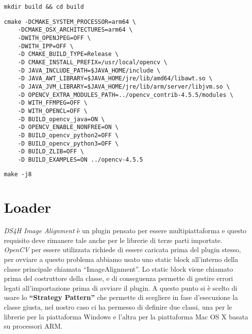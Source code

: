 \begin{lstlisting}[label={lst:mdkdirbuild}, caption={Creazione cartella Build}]
    mkdir build && cd build
\end{lstlisting}

\begin{minipage}{\linewidth}
\begin{lstlisting}[label={lst:extract}, caption={Esempio di creazione di build estrazione dalla sorgente per piattaforma MacOs X con processore M1}]
    cmake -DCMAKE_SYSTEM_PROCESSOR=arm64 \
    -DCMAKE_OSX_ARCHITECTURES=arm64 \
    -DWITH_OPENJPEG=OFF \
    -DWITH_IPP=OFF \
    -D CMAKE_BUILD_TYPE=Release \
    -D CMAKE_INSTALL_PREFIX=/usr/local/opencv \
    -D JAVA_INCLUDE_PATH=$JAVA_HOME/include \
    -D JAVA_AWT_LIBRARY=$JAVA_HOME/jre/lib/amd64/libawt.so \
    -D JAVA_JVM_LIBRARY=$JAVA_HOME/jre/lib/arm/server/libjvm.so \
    -D OPENCV_EXTRA_MODULES_PATH=../opencv_contrib-4.5.5/modules \
    -D WITH_FFMPEG=OFF \
    -D WITH_OPENCL=OFF \
    -D BUILD_opencv_java=ON \
    -D OPENCV_ENABLE_NONFREE=ON \
    -D BUILD_opencv_python2=OFF \
    -D BUILD_opencv_python3=OFF \
    -D BUILD_ZLIB=OFF \
    -D BUILD_EXAMPLES=ON ../opencv-4.5.5
\end{lstlisting}
\end{minipage}

\begin{lstlisting}[label={lst:compile}, caption={Esempio compilazione sorgente per piattaforma MacOs X con processore M1, usufruibile anche per altre piattaforme UNIX e LINUX}]
    make -j8
\end{lstlisting}

\section{Loader}
\noindent \textit{DS4H Image Alignment} è un plugin pensato per essere multipiattaforma e questo requisito deve rimanere tale anche per le librerie di terze parti importate. \textit{OpenCV} per essere utilizzata richiede di essere caricata prima del plugin stesso, per ovviare a questo problema abbiamo usato uno static block all'interno della classe principale chiamata ``ImageAlignment''. Lo static block viene chiamato prima del costruttore della classe, e di conseguenza permette di gestire errori legati all'importazione prima di avviare il plugin. A questo punto si è scelto di usare lo \textbf{``Strategy Pattern''} che permette di scegliere in fase d'esecuzione la classe giusta, nel nostro caso ci ha permesso di definire due classi, una per le librerie per la piattaforma Windows e l'altra per la piattaforma Mac OS X basata su processori ARM\@.

